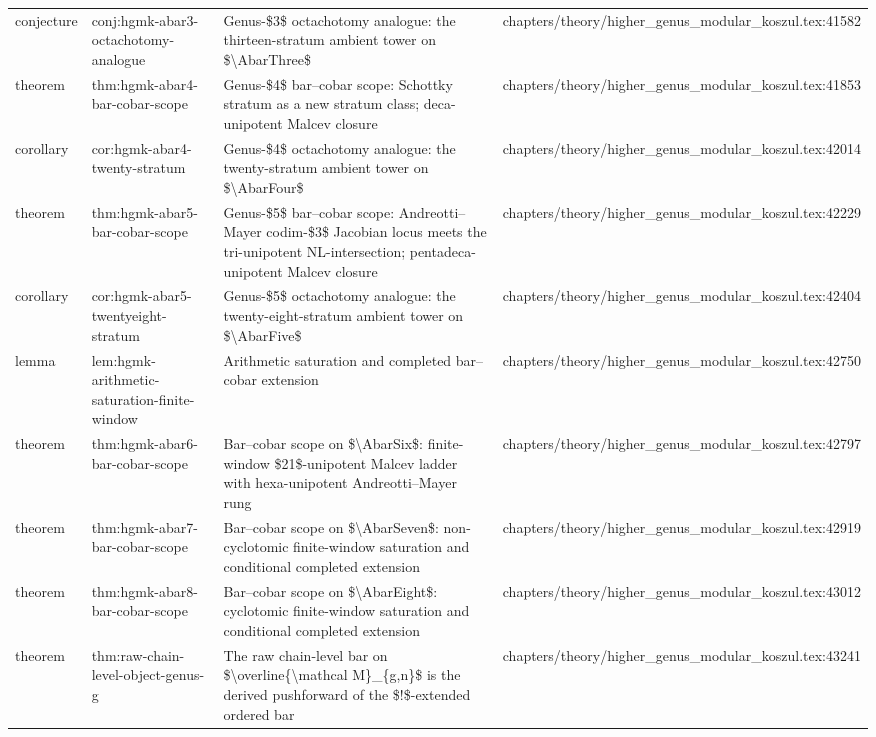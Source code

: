 \documentclass[11pt]{article}
\begin{document}
\begin{longtable}{L{0.10\textwidth}L{0.26\textwidth}L{0.42\textwidth}L{0.22\textwidth}}
conjecture & conj:hgmk-abar3-octachotomy-analogue & Genus-\$3\$ octachotomy analogue: the thirteen-stratum ambient tower on \$\textbackslash{}AbarThree\$ & chapters/theory/higher\_genus\_modular\_koszul.tex:41582\\
theorem & thm:hgmk-abar4-bar-cobar-scope & Genus-\$4\$ bar--cobar scope: Schottky stratum as a new stratum class; deca-unipotent Malcev closure & chapters/theory/higher\_genus\_modular\_koszul.tex:41853\\
corollary & cor:hgmk-abar4-twenty-stratum & Genus-\$4\$ octachotomy analogue: the twenty-stratum ambient tower on \$\textbackslash{}AbarFour\$ & chapters/theory/higher\_genus\_modular\_koszul.tex:42014\\
theorem & thm:hgmk-abar5-bar-cobar-scope & Genus-\$5\$ bar--cobar scope: Andreotti--Mayer codim-\$3\$ Jacobian locus meets the tri-unipotent NL-intersection; pentadeca-unipotent Malcev closure & chapters/theory/higher\_genus\_modular\_koszul.tex:42229\\
corollary & cor:hgmk-abar5-twentyeight-stratum & Genus-\$5\$ octachotomy analogue: the twenty-eight-stratum ambient tower on \$\textbackslash{}AbarFive\$ & chapters/theory/higher\_genus\_modular\_koszul.tex:42404\\
lemma & lem:hgmk-arithmetic-saturation-finite-window & Arithmetic saturation and completed bar--cobar extension & chapters/theory/higher\_genus\_modular\_koszul.tex:42750\\
theorem & thm:hgmk-abar6-bar-cobar-scope & Bar--cobar scope on \$\textbackslash{}AbarSix\$: finite-window \$21\$-unipotent Malcev ladder with hexa-unipotent Andreotti--Mayer rung & chapters/theory/higher\_genus\_modular\_koszul.tex:42797\\
theorem & thm:hgmk-abar7-bar-cobar-scope & Bar--cobar scope on \$\textbackslash{}AbarSeven\$: non-cyclotomic finite-window saturation and cond{}itional completed extension & chapters/theory/higher\_genus\_modular\_koszul.tex:42919\\
theorem & thm:hgmk-abar8-bar-cobar-scope & Bar--cobar scope on \$\textbackslash{}AbarEight\$: cyclotomic finite-window saturation and cond{}itional completed extension & chapters/theory/higher\_genus\_modular\_koszul.tex:43012\\
theorem & thm:raw-chain-level-object-genus-g & The raw chain-level bar on \$\textbackslash{}overline\{\textbackslash{}mathcal M\}\_\{g,n\}\$ is the derived pushforward of the \$!\$-extended ordered bar & chapters/theory/higher\_genus\_modular\_koszul.tex:43241\\

\end{longtable}
\end{document}
